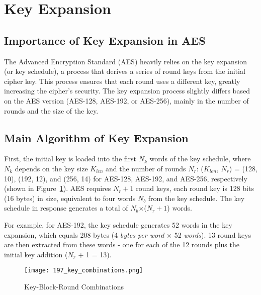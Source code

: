 \section{Key Expansion}

\subsection{Importance of Key Expansion in AES} 

The Advanced Encryption Standard (AES) heavily relies on the key expansion (or key schedule), 
a process that derives a series of round keys from the initial cipher key. 
This process ensures that each round uses a different key, 
greatly increasing the cipher's security. The key expansion process slightly differs 
based on the AES version (AES-128, AES-192, or AES-256), mainly in the number of rounds 
and the size of the key.

\subsection{Main Algorithm of Key Expansion}

First, the initial key is loaded into the first $N_k$ words of the key schedule, where $N_k$ depends 
on the key size $K_{len}$ and the number of rounds $N_r$: ($K_{len}$, $N_r$) = (128, 10), (192, 12), and (256, 14) 
for AES-128, AES-192, and AES-256, respectively \cite{Key_Collisions} (shown in Figure~\ref{fig:key_comb}). AES requires $N_r+1$ round keys, each round key is 
128 bits (16 bytes) in size, equivalent to four words $N_b$ from the key schedule. The key schedule in 
response generates a total of $N_b$×($N_r+1$) words\cite{NIST_AES}. \newline

For example, for AES-192, the key schedule generates 52 words in the key expansion, which equals 208 bytes (4 \textit{bytes per word} × 52 \textit{words}).
13 round keys are then extracted from these words - one for each of the 12 rounds plus the initial key addition ($N_r$ + 1 = 13).

\begin{figure}[h] %
    \centering
    \texttt{[image: 197\_key\_combinations.png]} %
    \caption{
        Key-Block-Round Combinations \cite{NIST_AES}
    }
    \label{fig:key_comb} %
\end{figure}

